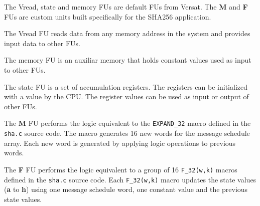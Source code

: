 The Vread, state and memory FUs are default FUs from Versat. The \textbf{M} and
\textbf{F} FUs are custom units built specifically for the SHA256 application.

The Vread FU reads data from any memory address in the system and provides input
data to other FUs.

The memory FU is an auxiliar memory that holds constant values used as input to
other FUs.

The state FU is a set of accumulation registers. The registers can be
initialized with a value by the CPU. The register values can be used as input or
output of other FUs.

The \textbf{M} FU performs the logic equivalent to the \texttt{EXPAND\_32}
macro defined in the \texttt{sha.c} source code. The macro generates 16 new
words for the message schedule array. Each new word is generated by applying
logic operations to previous words.

The \textbf{F} FU performs the logic equivalent to a group of 16
\texttt{F\_32(w,k)} macros defined in the \texttt{sha.c} source code.
Each \texttt{F\_32(w,k)} macro updates the state values (\textbf{a} to
\textbf{h}) using one message schedule word, one constant value and the
previous state values.

